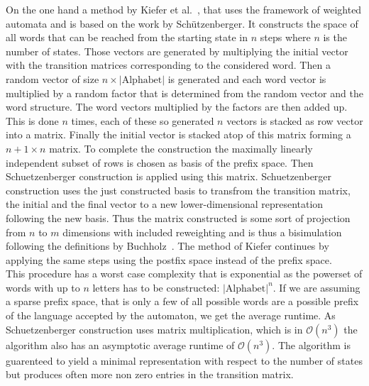 \documentclass[11pt, rgb]{scrartcl}
\begin{document}
On the one hand a method by Kiefer et al.~\autocite{Kiefer2013OnTC}, that uses the framework of weighted automata and is based on the work by Schützenberger\autocite{schutz}. 
It constructs the space of all words that can be reached from the starting state in $n$ steps where $n$ is the number of states. 
Those vectors are generated by multiplying the initial vector with the transition matrices corresponding to the considered word.
Then a random vector of size $n \times |\text{Alphabet}|$ is generated and each word vector is multiplied by a random factor that is determined from the random vector and the word structure. The word vectors multiplied by the factors are then added up.
This is done $n$ times, each of these so generated $n$ vectors is stacked as row vector into a matrix.
Finally the initial vector is stacked atop of this matrix forming a $n+1 \times n$ matrix.
To complete the construction the maximally linearly independent subset of rows is chosen as basis of the prefix space.
Then Schuetzenberger construction is applied using this matrix. Schuetzenberger construction uses the just constructed basis to transfrom the transition matrix, the initial and the final vector to a new lower-dimensional representation following the new basis. 
Thus the matrix constructed is some sort of projection from $n$ to $m$ dimensions with included reweighting and is thus a bisimulation following the definitions by Buchholz~\autocite{buchholz2008bisimulation}.
The method of Kiefer continues by applying the same steps using the postfix space instead of the prefix space. \\
This procedure has a worst case complexity that is exponential as the powerset of words with up to $n$ letters has to be constructed: $|\text{Alphabet}|^n$. If we are assuming a sparse prefix space, that is only a few of all possible words are a possible prefix of the language accepted by the automaton, we get the average runtime. As Schuetzenberger construction uses matrix multiplication, which is in $\mathcal{O}(n^3)$ the algorithm also has an asymptotic average runtime of $\mathcal{O}(n^3)$. The algorithm is guarenteed to yield a minimal representation with respect to the number of states but produces often more non zero entries in the transition matrix. \\
\end{document}
